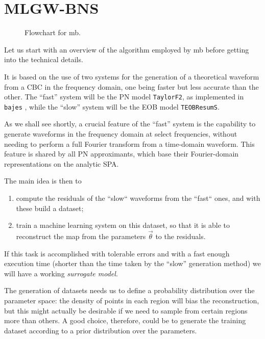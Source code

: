\documentclass[main.tex]{subfiles}
\begin{document}
\section{MLGW-BNS}

\begin{figure}[ht]
\centering

\caption{Flowchart for \ac{mb}.}
\label{fig:flowchart}
\end{figure}

Let us start with an overview of the algorithm employed by \ac{mb} before getting into the technical details. 

It is based on the use of two systems for the generation of a theoretical waveform from a \ac{CBC} in the frequency domain, one being faster but less accurate than the other.
The ``fast'' system will be the \ac{PN} model \texttt{TaylorF2}, as implemented in \texttt{bajes} \cite[]{breschiTtBajesBayesian2021}, while the ``slow'' system will be the \ac{EOB} model \texttt{TEOBResumS}.

As we shall see shortly, a crucial feature of the ``fast'' system is the capability to generate waveforms in the frequency domain at select frequencies, without needing to perform a full Fourier transform from a time-domain waveform.
This feature is shared by all \ac{PN} approximants, which base their Fourier-domain representations on the analytic \ac{SPA}.

The main idea is then to 
\begin{enumerate}
    \item compute the residuals of the ``slow`` waveforms from the ``fast`` ones, and with these build a dataset;
    \item train a machine learning system on this dataset, so that it is able to reconstruct the map from the parameters \(\vec{\theta}\) to the residuals.
\end{enumerate}

If this task is accomplished with tolerable errors and with a fast enough execution time (shorter than the time taken by the ``slow'' generation method) we will have a working \emph{surrogate model}. 

The generation of datasets needs us to define a probability distribution over the parameter space: the density of points in each region will bias the reconstruction, but this might actually be desirable if we need to sample from certain regions more than others. 
A good choice, therefore, could be to generate the training dataset according to a prior distribution over the parameters. 
\end{document}

